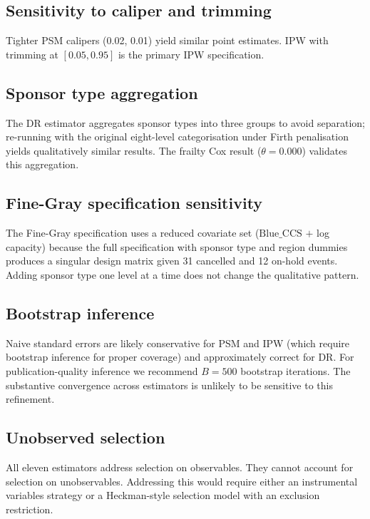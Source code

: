 \documentclass[11pt,a4paper]{article}
\newcommand{\BlueCCS}{\mathrm{Blue\_CCS}}
\begin{document}
\subsection{Sensitivity to caliper and trimming}

Tighter PSM calipers (0.02, 0.01) yield similar point estimates. IPW with trimming at $[0.05, 0.95]$ is the primary IPW specification.

\subsection{Sponsor type aggregation}

The DR estimator aggregates sponsor types into three groups to avoid separation; re-running with the original eight-level categorisation under Firth penalisation yields qualitatively similar results. The frailty Cox result ($\theta = 0.000$) validates this aggregation.

\subsection{Fine-Gray specification sensitivity}

The Fine-Gray specification uses a reduced covariate set ($\BlueCCS$ $+$ log capacity) because the full specification with sponsor type and region dummies produces a singular design matrix given 31 cancelled and 12 on-hold events. Adding sponsor type one level at a time does not change the qualitative pattern.

\subsection{Bootstrap inference}

Naive standard errors are likely conservative for PSM and IPW (which require bootstrap inference for proper coverage) and approximately correct for DR. For publication-quality inference we recommend $B = 500$ bootstrap iterations. The substantive convergence across estimators is unlikely to be sensitive to this refinement.

\subsection{Unobserved selection}

All eleven estimators address selection on observables. They cannot account for selection on unobservables. Addressing this would require either an instrumental variables strategy or a Heckman-style selection model \citep{Heckman1979} with an exclusion restriction.
\end{document}
